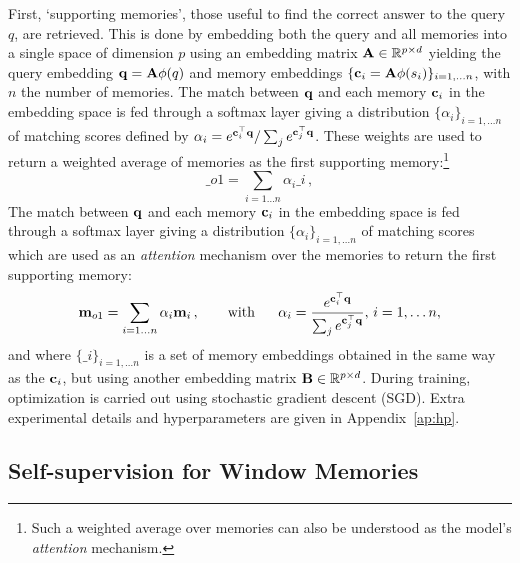 First, `supporting memories', those useful to find the correct answer to the query $q$, are retrieved. This is done by embedding both the query and all memories into a single space of dimension $p$ using an embedding matrix ${\bf A}\in\mathbb{R}^{p \times d}$ yielding the query embedding  ${\bf q}={\bf A}\phi(q)$ and memory embeddings $\{{\bf c}_i={\bf A}\phi(s_i)\}_{i=1,\dots n}$, with $n$ the number of memories. %
%
The match between ${\bf q}$ and each memory ${\bf c}_i$ in the embedding space is fed through a softmax layer giving a distribution \(\{\alpha_i\}_{i=1, \dots n}\) of matching scores defined by $\alpha_i =  e^{{\bf c}_i^\top{\bf q}} / \sum_j e^{{\bf c}_j^\top{\bf q}}$. These weights are used to return a weighted average of memories as the first supporting memory:\footnote{Such a weighted average over memories can also be understood as the model's \emph{attention} mechanism.} 
\begin{equation} \label{eq:eq_o}
  \bm_{o1} = \sum_{i=1 \dots n} \alpha_{i} \bm_i \,,
\end{equation}
\fi
The match between ${\bf q}$ and each memory ${\bf c}_i$ in the embedding space is fed through a softmax layer giving a distribution \(\{\alpha_i\}_{i=1, \dots n}\) of matching scores which are used as an \emph{attention} mechanism over the memories to return the first supporting memory:%
\begin{equation} \label{eq:eq_o}
  {\bf m}_{o1} = \sum_{i=1 \dots n} \alpha_{i} {\bf m}_i\,, \mbox{~~~~~~}\text{with~~~~~}\alpha_i =  \frac{e^{{\bf c}_i^\top{\bf q}}}{\sum_j e^{{\bf c}_j^\top{\bf q}}}, \, i=1,\dots n,
\end{equation}
and where $\{\bm_i\}_{i=1,\dots n}$ is a set of memory embeddings obtained in the same way as the ${\bf c}_i$, but using another embedding matrix ${\bf B}\in\mathbb{R}^{p\times d}$. During training, optimization is carried out using stochastic gradient descent (SGD). Extra experimental details and hyperparameters are given in Appendix~\ref{ap:hp}.



\subsection{Self-supervision for Window Memories} \label{sec:ssup}

